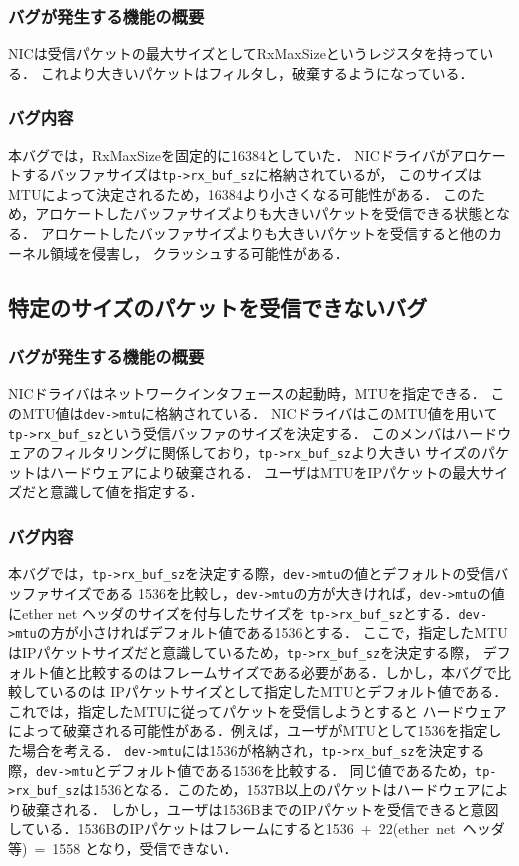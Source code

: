 \documentclass[12pt]{jsarticle}
\begin{document}
\subsubsection{バグが発生する機能の概要}
NICは受信パケットの最大サイズとしてRxMaxSizeというレジスタを持っている．
これより大きいパケットはフィルタし，破棄するようになっている．

\subsubsection{バグ内容}
本バグでは，RxMaxSizeを固定的に16384としていた．
NICドライバがアロケートするバッファサイズは{\tt tp->rx\_buf\_sz}に格納されているが，
このサイズはMTUによって決定されるため，16384より小さくなる可能性がある．
このため，アロケートしたバッファサイズよりも大きいパケットを受信できる状態となる．
アロケートしたバッファサイズよりも大きいパケットを受信すると他のカーネル領域を侵害し，
クラッシュする可能性がある．

\subsection{特定のサイズのパケットを受信できないバグ}
\subsubsection{バグが発生する機能の概要}
NICドライバはネットワークインタフェースの起動時，MTUを指定できる．
このMTU値は{\tt dev->mtu}に格納されている．
NICドライバはこのMTU値を用いて{\tt tp->rx\_buf\_sz}という受信バッファのサイズを決定する．
このメンバはハードウェアのフィルタリングに関係しており，{\tt tp->rx\_buf\_sz}より大きい
サイズのパケットはハードウェアにより破棄される．
ユーザはMTUをIPパケットの最大サイズだと意識して値を指定する．

\subsubsection{バグ内容}
本バグでは，{\tt tp->rx\_buf\_sz}を決定する際，{\tt dev->mtu}の値とデフォルトの受信バッファサイズである
1536を比較し，{\tt dev->mtu}の方が大きければ，{\tt dev->mtu}の値にether net ヘッダのサイズを付与したサイズを
{\tt tp->rx\_buf\_sz}とする．{\tt dev->mtu}の方が小さければデフォルト値である1536とする．
ここで，指定したMTUはIPパケットサイズだと意識しているため，{\tt tp->rx\_buf\_sz}を決定する際，
デフォルト値と比較するのはフレームサイズである必要がある．しかし，本バグで比較しているのは
IPパケットサイズとして指定したMTUとデフォルト値である．これでは，指定したMTUに従ってパケットを受信しようとすると
ハードウェアによって破棄される可能性がある．例えば，ユーザがMTUとして1536を指定した場合を考える．
{\tt dev->mtu}には1536が格納され，{\tt tp->rx\_buf\_sz}を決定する際，{\tt dev->mtu}とデフォルト値である1536を比較する．
同じ値であるため，{\tt tp->rx\_buf\_sz}は1536となる．このため，1537B以上のパケットはハードウェアにより破棄される．
しかし，ユーザは1536BまでのIPパケットを受信できると意図している．1536BのIPパケットはフレームにすると\mbox{1536 + 22(ether net ヘッダ等) = 1558}
となり，受信できない．
\end{document}
